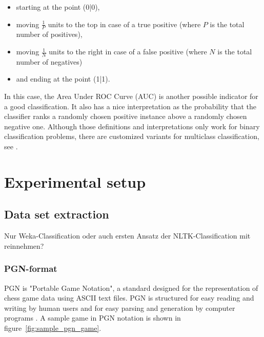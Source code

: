 \documentclass[article,type=msc,colorback,accentcolor=tud7b]{tudthesis}
\begin{document}
    \begin{itemize}[noitemsep]
      \item starting at the point (0|0),
      \item moving $\frac{1}{P}$ units to the top in case of a true positive (where $P$ is the total number of positives),
      \item moving $\frac{1}{N}$ units to the right in case of a false positive (where $N$ is the total number of negatives)
      \item and ending at the point (1|1).
    \end{itemize}
    In this case, the Area Under ROC Curve (AUC) is another possible indicator for a good classification. It also has a nice interpretation as the probability that the classifier ranks a randomly chosen positive instance above a randomly chosen negative one. Although those definitions and interpretations only work for binary classification problems, there are customized variants for multiclass classification, see \autocite{Hand2001}.

  \clearpage
  
  \section{Experimental setup}
  \label{sec:experimental_setup}
  
  \subsection{Data set extraction}
    Nur Weka-Classification oder auch ersten Ansatz der NLTK-Classification mit reinnehmen?

  \subsubsection{PGN-format}
    PGN is "Portable Game Notation", a standard designed for the representation of chess game data using ASCII text files. PGN is structured for easy reading and writing by human users and for easy parsing and generation by computer programs \autocite[Chapter~1]{Edwards1994}. A sample game in PGN notation is shown in figure~\ref{fig:sample_pgn_game}.
\end{document}
